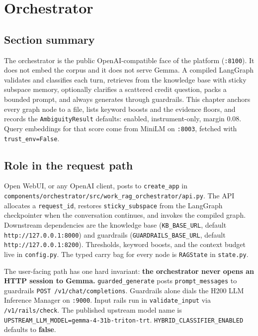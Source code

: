 \chapter{Orchestrator}\label{orchestrator}

\section{Section summary}\label{section-summary}

The orchestrator is the public OpenAI-compatible face of the platform (\texttt{:8100}). It does not embed the corpus and it does not serve Gemma. A compiled LangGraph validates and classifies each turn, retrieves from the knowledge base with sticky subspace memory, optionally clarifies a scattered credit question, packs a bounded prompt, and always generates through guardrails. This chapter anchors every graph node to a file, lists keyword boosts and the evidence floors, and records the \texttt{AmbiguityResult} defaults: enabled, instrument-only, margin 0.08. Query embeddings for that score come from MiniLM on \texttt{:8003}, fetched with \texttt{trust\_env=False}.

\section{Role in the request path}\label{role-in-the-request-path}

Open WebUI, or any OpenAI client, posts to \texttt{create\_app} in \texttt{components/orchestrator/src/work\_rag\_orchestrator/api.py}. The API allocates a \texttt{request\_id}, restores \texttt{sticky\_subspace} from the LangGraph checkpointer when the conversation continues, and invokes the compiled graph. Downstream dependencies are the knowledge base (\texttt{KB\_BASE\_URL}, default \texttt{http://127.0.0.1:8000}) and guardrails (\texttt{GUARDRAILS\_BASE\_URL}, default \texttt{http://127.0.0.1:8200}). Thresholds, keyword boosts, and the context budget live in \texttt{config.py}. The typed carry bag for every node is \texttt{RAGState} in \texttt{state.py}.

The user-facing path has one hard invariant: \textbf{the orchestrator never opens an HTTP session to Gemma.} \texttt{guarded\_generate} posts \texttt{prompt\_messages} to guardrails \texttt{POST\ /v1/chat/completions}. Guardrails alone dials the H200 LLM Inference Manager on \texttt{:9000}. Input rails run in \texttt{validate\_input} via \texttt{/v1/rails/check}. The published upstream model name is \texttt{UPSTREAM\_LLM\_MODEL=gemma-4-31b-triton-trt}. \texttt{HYBRID\_CLASSIFIER\_ENABLED} defaults to \textbf{false}.

